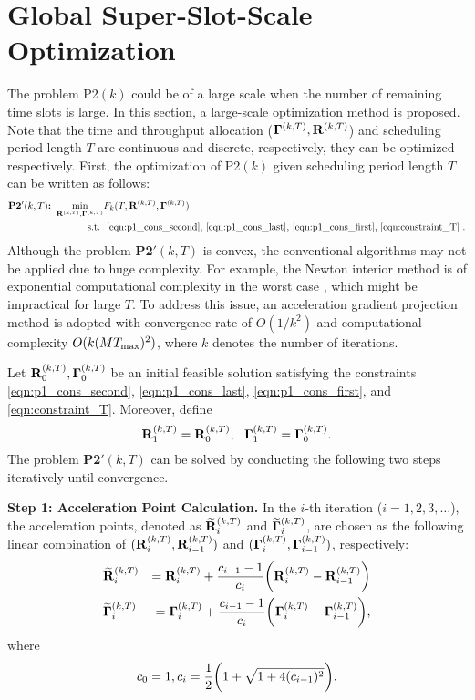 \section{Global Super-Slot-Scale Optimization}
\label{sec:kernel-policy}
The problem P2$(k)$ could be of a large scale when the number of remaining time slots is large. In this section, a large-scale optimization method is proposed.
Note that the time and throughput allocation ($\mathbf{\Gamma}^{(k,T)}, \mathbf{R}^{(k,T)}$) and scheduling period length $T$ are continuous and discrete, respectively, they can be optimized respectively. First, the optimization of P2$(k)$ given scheduling period length $T$ can be written as follows:
\begin{align}
    \textbf{P2$'(k,T)$:~}
    \min_{ \mathbf{R}^{(k,T)}, \mathbf{\Gamma}^{(k,T)} } &F_k( T, \mathbf{R}^{(k,T)}, \mathbf{\Gamma}^{(k,T)} )
    \\\nonumber
    \text{s.t.~} & \text{ \eqref{eqn:p1_cons_second}, \eqref{eqn:p1_cons_last}, \eqref{eqn:p1_cons_first}, \eqref{eqn:constraint_T} }.
\end{align}
Although the problem \textbf{P2$'(k,T)$} is convex, the conventional algorithms may not be applied due to huge complexity.
For example, the Newton interior method is of exponential computational complexity in the worst case \cite{monteiro1994}, which might be impractical for large $T$.
To address this issue, an acceleration gradient projection method \cite{Nesterov83} is adopted with convergence rate of $O(1/k^2)$ and computational complexity $O(k (M{T_{\max}})^2)$, where $k$ denotes the number of iterations.

Let $\mathbf{R}^{(k,T)}_{0}, \mathbf{\Gamma}^{(k,T)}_{0}$ be an initial feasible solution satisfying the constraints \eqref{eqn:p1_cons_second}, \eqref{eqn:p1_cons_last}, \eqref{eqn:p1_cons_first}, and \eqref{eqn:constraint_T}.
Moreover, define
$$\mathbf{R}^{(k,T)}_{1}=\mathbf{R}^{(k,T)}_{0}, ~~\mathbf{\Gamma}^{(k,T)}_{1}=\mathbf{\Gamma}^{(k,T)}_{0}.$$
The problem \textbf{P2$'(k,T)$} can be solved by conducting the following two steps iteratively until convergence. 

\textbf{Step 1: Acceleration Point Calculation.}
In the $i$-th iteration ($i=1,2,3,\dots$), the acceleration points, denoted as $\widetilde{\mathbf{R}}^{(k,T)}_{i}$ and $\widetilde{\mathbf{\Gamma}}^{(k,T)}_{i}$, are chosen as the following linear combination of $(\mathbf{R}^{(k,T)}_{i}, \mathbf{R}^{(k,T)}_{i-1})$ and $(\mathbf{\Gamma}^{(k,T)}_{i}, \mathbf{\Gamma}^{(k,T)}_{i-1})$, respectively:
\begin{eqnarray*}
    &\widetilde{\mathbf{R}}^{(k,T)}_{i} &= \mathbf{R}^{(k,T)}_{i} + \frac{c_{i-1}-1}{c_{i}} \bigg(
        \mathbf{R}^{(k,T)}_{i} - \mathbf{R}^{(k,T)}_{i-1}
    \bigg)\nonumber
    \\
    &\widetilde{\mathbf{\Gamma}}^{(k,T)}_{i} &= \mathbf{\Gamma}^{(k,T)}_{i} + \frac{c_{i-1}-1}{c_{i}}  \bigg(
        \mathbf{\Gamma}^{(k,T)}_{i} - \mathbf{\Gamma}^{(k,T)}_{i-1} 
    \bigg),\nonumber
\end{eqnarray*}
where
\begin{align*}
    c_{0} = 1, c_{i} = \frac{1}{2} \bigg( 1+\sqrt{ 1+4(c_{i-1})^2 } \bigg).
\end{align*}

